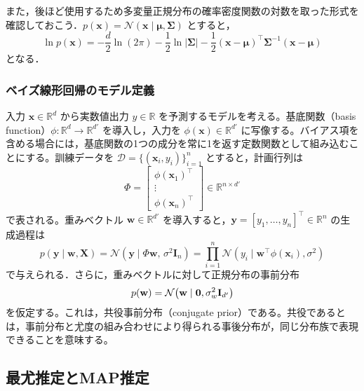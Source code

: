 \documentclass[titlepage]{ltjsbook}
\begin{document}
また，後ほど使用するため多変量正規分布の確率密度関数の対数を取った形式を確認しておこう．$p(\mathbf{x})=\mathcal{N}(\mathbf{x} \mid \boldsymbol{\mu}, \boldsymbol{\Sigma}) $ とすると，
\begin{equation}
\ln p(\mathbf{x}) = -\frac{d}{2} \ln (2\pi) - \frac{1}{2} \ln \lvert\boldsymbol{\Sigma}\rvert - \frac{1}{2}(\mathbf{x} - \boldsymbol{\mu})^\top \boldsymbol{\Sigma}^{-1} (\mathbf{x} - \boldsymbol{\mu})
\end{equation}
となる．

\subsubsection{ベイズ線形回帰のモデル定義}
入力 $\mathbf{x} \in \mathbb{R}^d$ から実数値出力 $y \in \mathbb{R}$ を予測するモデルを考える。基底関数（basis function）$\phi:\mathbb{R}^d \to \mathbb{R}^{d'}$ を導入し，入力を $\phi(\mathbf{x}) \in \mathbb{R}^{d'}$ に写像する。バイアス項を含める場合には，基底関数の1つの成分を常に1を返す定数関数として組み込むことにする。訓練データを $\mathcal{D}=\{(\mathbf{x}_i, y_i)\}_{i=1}^n$ とすると，計画行列は
\begin{equation}
\Phi = 
\begin{bmatrix}
\phi(\mathbf{x}_1)^\top \\
\vdots \\
\phi(\mathbf{x}_n)^\top
\end{bmatrix}
\in \mathbb{R}^{n\times d'}
\end{equation}
で表される。重みベクトル $\mathbf{w}\in\mathbb{R}^{d'}$ を導入すると，$\mathbf{y}=[y_1,\dots,y_n]^\top \in \mathbb{R}^n$ の生成過程は
\begin{equation}
p(\mathbf{y}\mid \mathbf{w},\mathbf{X})
=\mathcal{N}\!\left(\mathbf{y}\mid \Phi \mathbf{w},\,\sigma^2\mathbf{I}_n\right)
= \prod_{i=1}^n \mathcal{N}\!\left(y_i\mid \mathbf{w}^\top \phi(\mathbf{x}_i), \sigma^2\right)
\end{equation}
で与えられる．さらに，重みベクトルに対して正規分布の事前分布
\begin{equation}
p(\mathbf{w})=\mathcal{N}\!\left(\mathbf{w}\mid \mathbf{0},\sigma_w^2 \mathbf{I}_{d'}\\\right)
\end{equation}
を仮定する。これは，共役事前分布（conjugate prior）である。共役であるとは，事前分布と尤度の組み合わせにより得られる事後分布が，同じ分布族で表現できることを意味する。

\subsection{最尤推定とMAP推定}
\end{document}

